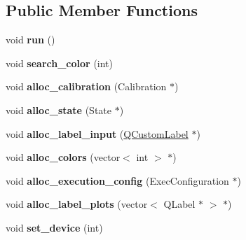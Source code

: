 \subsection*{Public Member Functions}
\begin{DoxyCompactItemize}
\item 
void {\bfseries run} ()\hypertarget{classvision_ad213bf1ae76ed6a489390c501fe1b4e0}{}\label{classvision_ad213bf1ae76ed6a489390c501fe1b4e0}

\item 
void {\bfseries search\+\_\+color} (int)\hypertarget{classvision_a908d37e077c8844e2bfd5b38a1f65577}{}\label{classvision_a908d37e077c8844e2bfd5b38a1f65577}

\item 
void {\bfseries alloc\+\_\+calibration} (Calibration $\ast$)\hypertarget{classvision_a81fd57a35d8e331f844e1d276d8272f6}{}\label{classvision_a81fd57a35d8e331f844e1d276d8272f6}

\item 
void {\bfseries alloc\+\_\+state} (State $\ast$)\hypertarget{classvision_a4f8eec2ffc63e3a2b3e76c347b13f537}{}\label{classvision_a4f8eec2ffc63e3a2b3e76c347b13f537}

\item 
void {\bfseries alloc\+\_\+label\+\_\+input} (\hyperlink{classQCustomLabel}{Q\+Custom\+Label} $\ast$)\hypertarget{classvision_a5951eb6e1bb8582b3f01dec96d3ad3ac}{}\label{classvision_a5951eb6e1bb8582b3f01dec96d3ad3ac}

\item 
void {\bfseries alloc\+\_\+colors} (vector$<$ int $>$ $\ast$)\hypertarget{classvision_a5d366b880029815afed304c1d2d29bfc}{}\label{classvision_a5d366b880029815afed304c1d2d29bfc}

\item 
void {\bfseries alloc\+\_\+execution\+\_\+config} (Exec\+Configuration $\ast$)\hypertarget{classvision_a3d623a2e736f204716f1d44bf496823f}{}\label{classvision_a3d623a2e736f204716f1d44bf496823f}

\item 
void {\bfseries alloc\+\_\+label\+\_\+plots} (vector$<$ Q\+Label $\ast$ $>$ $\ast$)\hypertarget{classvision_a75142dd50f6818ae2d954a1070b7e721}{}\label{classvision_a75142dd50f6818ae2d954a1070b7e721}

\item 
void {\bfseries set\+\_\+device} (int)\hypertarget{classvision_af1d8cd9e34b8bd73d9c8b6eabc235936}{}\label{classvision_af1d8cd9e34b8bd73d9c8b6eabc235936}


\end{DoxyCompactItemize}
